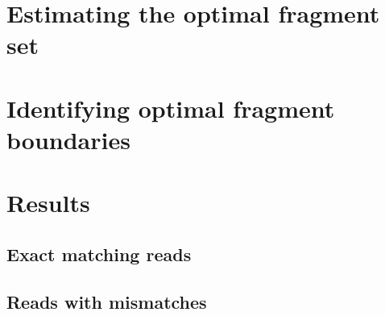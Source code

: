 \section{Estimating the optimal fragment set}


\section{Identifying optimal fragment boundaries}


\section{Results}

\subsection{Exact matching reads}

\subsection{Reads with mismatches}
